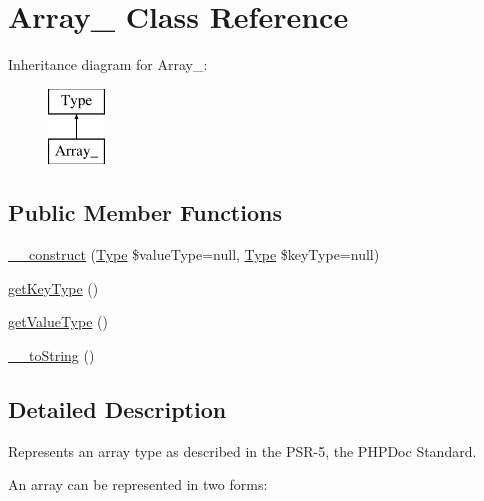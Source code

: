 \hypertarget{classphp_documentor_1_1_reflection_1_1_types_1_1_array__}{}\section{Array\+\_\+ Class Reference}
\label{classphp_documentor_1_1_reflection_1_1_types_1_1_array__}
Inheritance diagram for Array\+\_\+\+:\begin{figure}[H]
\begin{center}
\leavevmode
\includegraphics[height=2.000000cm]{classphp_documentor_1_1_reflection_1_1_types_1_1_array__}
\end{center}
\end{figure}
\subsection*{Public Member Functions}
\begin{DoxyCompactItemize}
\item 
\mbox{\hyperlink{classphp_documentor_1_1_reflection_1_1_types_1_1_array___a9acd936edf9b2db3830804345a804f68}{\+\_\+\+\_\+construct}} (\mbox{\hyperlink{interfacephp_documentor_1_1_reflection_1_1_type}{Type}} \$value\+Type=null, \mbox{\hyperlink{interfacephp_documentor_1_1_reflection_1_1_type}{Type}} \$key\+Type=null)
\item 
\mbox{\hyperlink{classphp_documentor_1_1_reflection_1_1_types_1_1_array___a2997a81ff329b8d8031c1a13b12cc5f6}{get\+Key\+Type}} ()
\item 
\mbox{\hyperlink{classphp_documentor_1_1_reflection_1_1_types_1_1_array___a54471d3ffde79f0dd0f32938c36f75df}{get\+Value\+Type}} ()
\item 
\mbox{\hyperlink{classphp_documentor_1_1_reflection_1_1_types_1_1_array___a7516ca30af0db3cdbf9a7739b48ce91d}{\+\_\+\+\_\+to\+String}} ()
\end{DoxyCompactItemize}


\subsection{Detailed Description}
Represents an array type as described in the P\+S\+R-\/5, the P\+H\+P\+Doc Standard.

An array can be represented in two forms\+:


